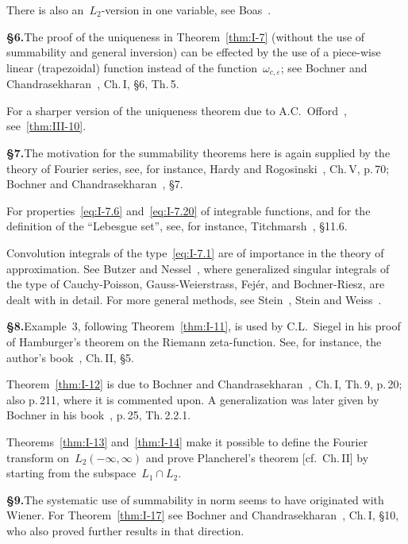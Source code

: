 \noindent There is also an~$L_{2}$-version in one variable, see Boas~\cite{boas1946}.

\noindent\textbf{§6.}\quad The proof of the uniqueness in Theorem~\ref{thm:I-7} (without the use of summability and general inversion) can be effected by the use of a piece-wise linear (trapezoidal) function instead of the function~$\omega_{c,\varepsilon}$; see Bochner and Chandrasekharan~\cite{bochnerchandrasekharan1949}, Ch.\,I, §6, Th.\,5.

\noindent For a sharper version of the uniqueness theorem due to A.C.~Offord~\cite{offord1936}, see~\ref{thm:III-10}.

\noindent\textbf{§7.}\quad The motivation for the summability theorems here is again supplied by the theory of Fourier series, see, for instance, Hardy and Rogosinski~\cite{hardyrogo1944}, Ch.\,V, p.\,70; Bochner and Chandrasekharan~\cite{bochnerchandrasekharan1949}, §7.

\noindent For properties~\eqref{eq:I-7.6} and~\eqref{eq:I-7.20} of integrable functions, and for the definition of the ``Lebesgue set'', see, for instance, Titchmarsh~\cite{titchmarsh1939}, §11.6.

\noindent Convolution integrals of the type~\eqref{eq:I-7.1} are of importance in the theory of approximation. See Butzer and Nessel~\cite{butzernessel1971}, where generalized singular integrals of the type of Cauchy-Poisson, Gauss-Weierstrass, Fej\'er, and Bochner-Riesz, are dealt with in detail. For more general methods, see Stein~\cite{stein1970}, Stein and Weiss~\cite{steinweiss1971}.

\noindent\textbf{§8.}\quad Example~3, following Theorem~\ref{thm:I-11}, is used by C.L.~Siegel in his proof of Hamburger's theorem on the Riemann zeta-function. See, for instance, the author's book~\cite{chandrasekharan1970}, Ch.\,II, §5.

\noindent Theorem~\ref{thm:I-12} is due to Bochner and Chandrasekharan~\cite{bochnerchandrasekharan1949}, Ch.\,I, Th.\,9, p.\,20; also p.\,211, where it is commented upon. A generalization was later given by Bochner in his book~\cite{bochner1955}, p.\,25, Th.\,2.2.1.

\noindent Theorems~\ref{thm:I-13} and~\ref{thm:I-14} make it possible to define the Fourier transform on~$L_2(-\infty,\infty)$ and prove Plancherel's theorem [cf.~Ch.\,II] by starting from the subspace~$L_1\cap L_2$.

\noindent\textbf{§9.}\quad The systematic use of summability in norm seems to have originated with Wiener. For Theorem~\ref{thm:I-17} see Bochner and Chandrasekharan~\cite{bochnerchandrasekharan1949}, Ch.\,I, §10, who also proved further results in that direction.

